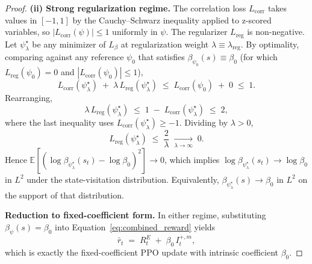 \begin{proof}
\textbf{(ii) Strong regularization regime.} The correlation loss $L_\text{corr}$ takes values in $[-1, 1]$ by the Cauchy--Schwarz inequality applied to z-scored variables, so $|L_\text{corr}(\psi)| \le 1$ uniformly in $\psi$. The regularizer $L_\text{reg}$ is non-negative. Let $\psi^\star_\lambda$ be any minimizer of $L_\beta$ at regularization weight $\lambda \equiv \lambda_\text{reg}$. By optimality, comparing against any reference $\psi_0$ that satisfies $\beta_{\psi_0}(s) \equiv \beta_0$ (for which $L_\text{reg}(\psi_0) = 0$ and $|L_\text{corr}(\psi_0)| \le 1$),
\begin{equation*}
L_\text{corr}(\psi^\star_\lambda) \;+\; \lambda\, L_\text{reg}(\psi^\star_\lambda)
\;\le\; L_\text{corr}(\psi_0) \;+\; 0
\;\le\; 1.
\end{equation*}
Rearranging,
\begin{equation*}
\lambda\, L_\text{reg}(\psi^\star_\lambda)
\;\le\; 1 \;-\; L_\text{corr}(\psi^\star_\lambda)
\;\le\; 2,
\end{equation*}
where the last inequality uses $L_\text{corr}(\psi^\star_\lambda) \ge -1$. Dividing by $\lambda > 0$,
\begin{equation*}
L_\text{reg}(\psi^\star_\lambda)
\;\le\; \frac{2}{\lambda}
\;\xrightarrow[\lambda \to \infty]{}\; 0.
\end{equation*}
Hence $\mathbb{E}[(\log \beta_{\psi^\star_\lambda}(s_t) - \log \beta_0)^2] \to 0$, which implies $\log \beta_{\psi^\star_\lambda}(s_t) \to \log \beta_0$ in $L^2$ under the state-visitation distribution. Equivalently, $\beta_{\psi^\star_\lambda}(s) \to \beta_0$ in $L^2$ on the support of that distribution.

\textbf{Reduction to fixed-coefficient form.} In either regime, substituting $\beta_\psi(s) = \beta_0$ into Equation~\eqref{eq:combined_reward} yields
\begin{equation*}
\bar r_t \;=\; R_t^E \;+\; \beta_0\, I_t^{+,m},
\end{equation*}
which is exactly the fixed-coefficient PPO update with intrinsic coefficient $\beta_0$.
\end{proof}
